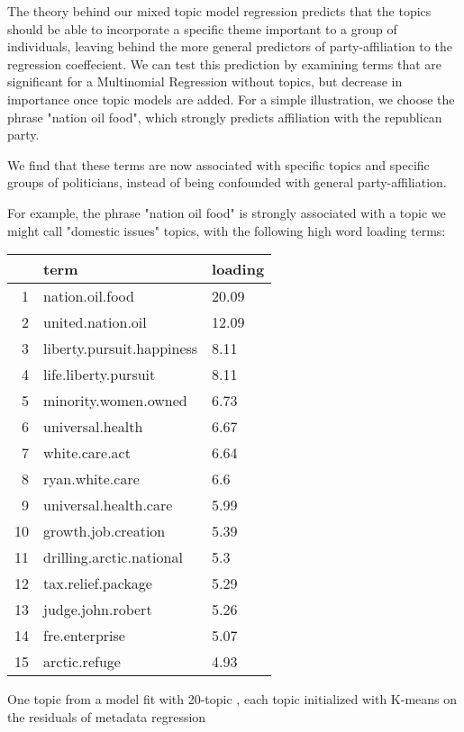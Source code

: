 \documentclass[12pt]{article}
\begin{document}
The theory behind our mixed topic model regression predicts that the topics should be able to incorporate a specific theme important to a group of individuals, leaving behind the more general predictors of party-affiliation to the regression coeffecient.
We can test this prediction by examining terms that are significant for a Multinomial Regression without topics, but decrease in importance once topic models are added. For a simple illustration, we choose the phrase "nation oil food", which strongly predicts affiliation with the republican party. 

We find that these terms are now associated with specific topics and specific groups of politicians, instead of being confounded with general party-affiliation.

For example, the phrase "nation oil food" is strongly associated with a topic we might call "domestic issues" topics, with the following high word loading terms:


\begin{table}[ht]
\centering
\begin{threeparttable}
\begin{tabular}{rll}
  \hline
 & term & loading \\ 
  \hline
1 & nation.oil.food & 20.09 \\ 
  2 & united.nation.oil & 12.09 \\ 
  3 & liberty.pursuit.happiness & 8.11 \\ 
  4 & life.liberty.pursuit & 8.11 \\ 
  5 & minority.women.owned & 6.73 \\ 
  6 & universal.health & 6.67 \\ 
  7 & white.care.act & 6.64 \\ 
  8 & ryan.white.care & 6.6 \\ 
  9 & universal.health.care & 5.99 \\ 
  10 & growth.job.creation & 5.39 \\ 
  11 & drilling.arctic.national & 5.3 \\ 
  12 & tax.relief.package & 5.29 \\ 
  13 & judge.john.robert & 5.26 \\ 
  14 & fre.enterprise & 5.07 \\ 
  15 & arctic.refuge & 4.93 \\ 
   \hline
\end{tabular}
\begin{tablenotes}
\small
\item One topic from a model fit with 20-topic , each topic initialized with K-means on the residuals of metadata regression
\end{tablenotes}
\end{threeparttable}
\end{table}
\end{document}
